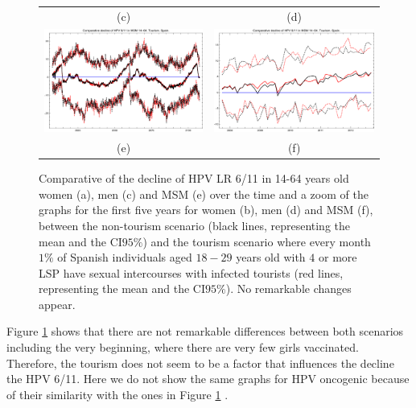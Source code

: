\begin{figure}[!]
\begin{tabular}{cc}
		(c)	& (d) \\ 		
		\includegraphics[width=0.5\linewidth]{IMGs/6.-Turismo/Decl_MSM_14_64_verr_Turismo.pdf}	& 
		\includegraphics[width=0.5\linewidth]{IMGs/6.-Turismo/Decl_MSM_14_64_verr_ZOOM_Turismo_ZOOM.pdf}  \\ 
		(e)	& (f)
 	\end{tabular} 
	\caption{Comparative of the decline of  HPV LR 6/11 in 14-64 years old women (a), men (c) and MSM (e) over the time and a zoom of the graphs for the first five years for women (b), men (d) and MSM (f), between the non-tourism scenario (black lines, representing  the mean and the CI$95\%$) and the tourism scenario where every month $1\%$ of Spanish individuals aged $18-29$ years old with $4$ or more LSP have sexual intercourses with infected tourists (red lines, representing  the mean and the CI$95\%$). No remarkable changes appear.}
	\label{fig:turismo}
\end{figure}

Figure \ref{fig:turismo} shows that there are not remarkable differences between both scenarios including the very beginning, where there are very few girls vaccinated. Therefore, the tourism does not seem to be a factor that influences the decline the HPV 6/11. Here we do not show the same graphs for HPV oncogenic because of their similarity with the ones in Figure \ref{fig:turismo} . 
